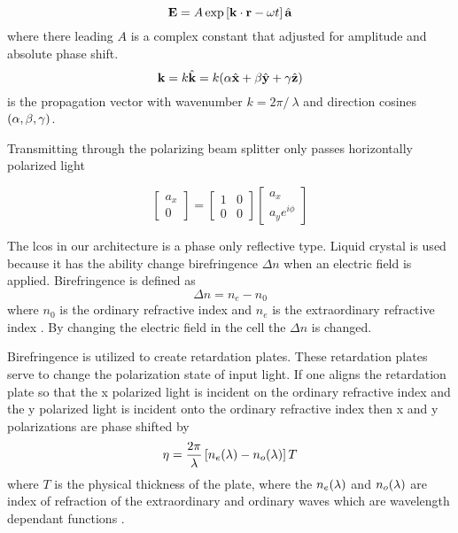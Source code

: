 \begin{equation}
\displaystyle \mathbf{E} = A \exp \left[ \displaystyle \mathbf{k} \cdot \displaystyle \mathbf{r} - \omega t \right] \hat{ \displaystyle \mathbf{a} }
\end{equation}
%
where there leading $A$ is a complex constant that adjusted for amplitude and absolute phase shift.
%
\begin{equation}
	\mb{k} = k \mbh{k} = k \ap{ \alpha \mbh{x} + \beta \mbh{y} + \gamma \mbh{z} }
\end{equation}
%
is the propagation vector with wavenumber $k = 2\pi /\ \lambda$ and direction cosines $\ap{\alpha, \beta, \gamma}$.

Transmitting through the polarizing beam splitter only passes horizontally polarized light

\begin{equation}
	\begin{bmatrix}
		a_x \\
		0 
	\end{bmatrix}
	=
	\begin{bmatrix}
		1 & 0 \\
		0 & 0
	\end{bmatrix}
	\begin{bmatrix}
		a_x  \\
		a_y e^{ i \phi  }
	\end{bmatrix}
	\label{eq:jonesAfterPBS1}
\end{equation}

The \gls{lcos} in our architecture is a phase only reflective type. Liquid crystal is used because it has the ability change birefringence $\Delta n$ when an electric field is applied. Birefringence is defined as 
%
\begin{equation}
	\Delta n = n_e - n_0
\end{equation}
%
where $n_0$ is the ordinary refractive index and $n_e$ is the extraordinary refractive index \cite{zhang2014fundamentals}. By changing the electric field in the cell the $\Delta n$ is changed. 

Birefringence is utilized to create retardation plates. These retardation plates serve to change the polarization state of input light. If one aligns the retardation plate so that the x polarized light is incident on the ordinary refractive index and the y polarized light is incident onto the ordinary refractive index then x and y polarizations are phase shifted by
%
\begin{equation}
	\eta = \frac{2 \pi}{\lambda} \left[ n_e\ap{\lambda} - n_o \ap{\lambda} \right] T
\end{equation}
%
where $T$ is the physical thickness of the plate, where the $ n_e \ap{ \lambda } $ and $ n_o \ap{\lambda} $ are index of refraction of the extraordinary and ordinary waves which are wavelength dependant functions \cite{milster2013notes}. 


